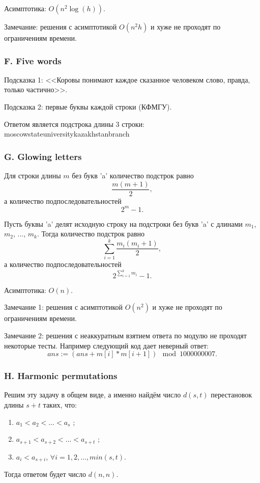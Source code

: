 Асимптотика: $O(n^2 \log(h) )$. 

Замечание:  решения с асимптотикой $O(n^2 h)$ и хуже не проходят по ограничениям времени.



\subsubsection*{F. Five words} 


Подсказка 1: <<Коровы понимают каждое сказанное человеком слово, правда, только частично>>.

Подсказка 2: первые буквы каждой строки (КФМГУ).

Ответом является подстрока длины 3 строки:\\ moscowstateuniversitykazakhstanbranch



\subsubsection*{G. Glowing letters} 


Для строки длины $m$ без букв 'a' количество подстрок равно
$$\frac{m(m+1)}{2},$$
а количество подпоследовательностей
$$2^m - 1.$$

Пусть буквы 'a' делят исходную строку на подстроки без букв 'a' с длинами $m_1$, $m_2$, ..., $m_k$. Тогда количество подстрок равно
$$\sum_{i=1}^k \frac{m_i(m_i+1)}{2},$$
а количество подпоследовательностей
$$2^{\sum_{i=1}^{k} m_i} - 1.$$ 

Асимптотика: $O(n)$.

Замечание 1: решения с асимптотикой $O(n^2)$ и хуже не проходят по ограничениям времени.

Замечание 2: решения с неаккуратным взятием ответа по модулю не проходят некоторые тесты. Например следующий код дает неверный ответ:
$$ans := (ans + m[i] * m[i+1]) \mod 1000000007.$$



\subsubsection*{H. Harmonic permutations} 


Решим эту задачу в общем виде, а именно найдём число $d(s, t)$ перестановок длины $s + t$ таких, что:
\begin{enumerate}
\item $a_1 < a_2 < \dots < a_s$ ;
\item $a_{s+1} < a_{s+2} < \dots < a_{s+t}$ ;
\item $a_i < a_{s+i}$, $\forall i = 1, 2, . . . , min(s, t)$.
\end{enumerate}
Тогда ответом будет число $d(n, n)$.

